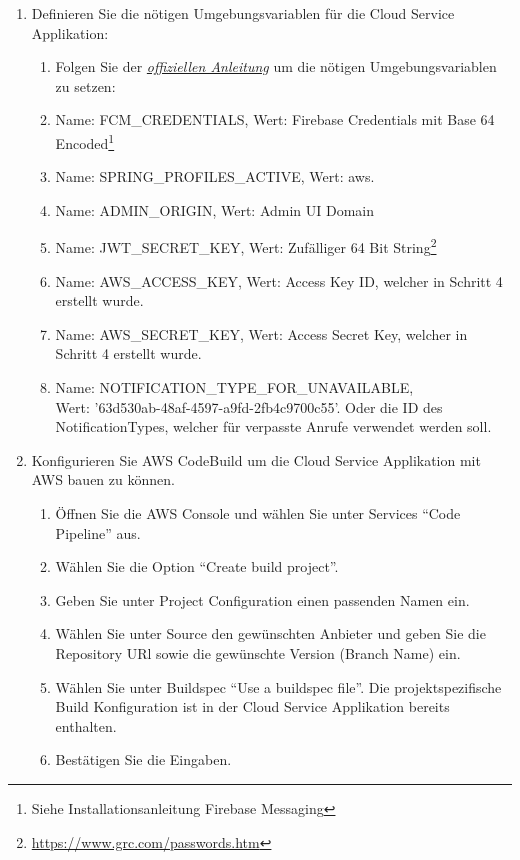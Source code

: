 \begin{enumerate}
    \item Definieren Sie die nötigen Umgebungsvariablen für die Cloud Service Applikation:
    \begin{enumerate}
        \item Folgen Sie der \href{https://docs.aws.amazon.com/elasticbeanstalk/latest/dg/environments-cfg-softwaresettings.html}{\textit{offiziellen Anleitung}}\cite{aws-elastic-env} um die nötigen Umgebungsvariablen zu setzen:
        \item Name: FCM\_CREDENTIALS, Wert: Firebase Credentials mit Base 64 Encoded\footnote{Siehe Installationsanleitung Firebase Messaging}
        \item Name: SPRING\_PROFILES\_ACTIVE, Wert: aws.
        \item Name: ADMIN\_ORIGIN, Wert: Admin UI Domain
        \item Name: JWT\_SECRET\_KEY, Wert: Zufälliger 64 Bit String\footnote{\url{https://www.grc.com/passwords.htm}}
        \item Name: AWS\_ACCESS\_KEY, Wert: Access Key ID, welcher in Schritt 4 erstellt wurde.
        \item Name: AWS\_SECRET\_KEY, Wert: Access Secret Key, welcher in Schritt 4 erstellt wurde.
        \item Name: NOTIFICATION\_TYPE\_FOR\_UNAVAILABLE, \\ Wert: '63d530ab-48af-4597-a9fd-2fb4c9700c55'. Oder die ID des NotificationTypes, welcher für verpasste Anrufe verwendet werden soll.
    \end{enumerate}
    \item Konfigurieren Sie AWS CodeBuild um die Cloud Service Applikation mit AWS bauen zu können.
    \begin{enumerate}
        \item Öffnen Sie die AWS Console und wählen Sie unter Services ``Code Pipeline'' aus.
        \item Wählen Sie die Option ``Create build project''.
        \item Geben Sie unter Project Configuration einen passenden Namen ein.
        \item Wählen Sie unter Source den gewünschten Anbieter und geben Sie die Repository URl sowie die gewünschte Version (Branch Name) ein.
        \item Wählen Sie unter Buildspec ``Use a buildspec file''. Die projektspezifische Build Konfiguration ist in der Cloud Service Applikation bereits enthalten.
        \item Bestätigen Sie die Eingaben.

\end{enumerate}
\end{enumerate}
